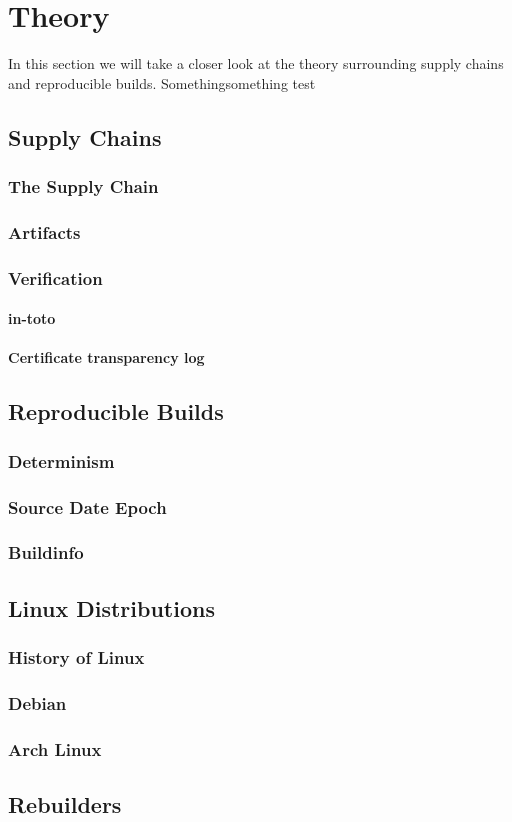 \documentclass[../Main/thesis.tex]{subfiles}
\begin{document}
\chapter{Theory}
\label{ch:theory}
In this section we will take a closer look at the theory surrounding
supply chains and reproducible builds. Somethingsomething test

\section{Supply Chains}\label{sec:supply_chain}
    \subsection*{The Supply Chain}
    \subsection*{Artifacts}
    \subsection*{Verification}
    \subsubsection*{in-toto}
    \subsubsection*{Certificate transparency log}

\section{Reproducible Builds}\label{sec:reproducible_builds}
    \subsection*{Determinism}
    \subsection*{Source Date Epoch}
    \subsection*{Buildinfo}

\section{Linux Distributions}\label{sec:linux_distributions}
    \subsection*{History of Linux}
    \subsection*{Debian}
    \subsection*{Arch Linux}

\section{Rebuilders}\label{sec:rebuilders} 

\blankpage
\end{document}
